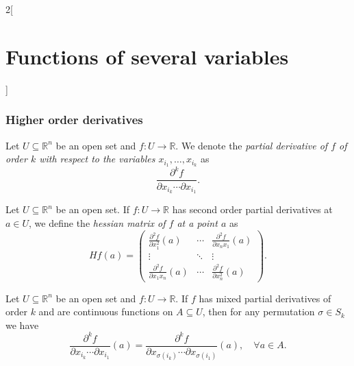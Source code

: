 \documentclass[../../../main.tex]{subfiles}
\begin{document}
\begin{multicols}{2}[\section{Functions of several variables}]
\subsubsection*{Higher order derivatives}
\begin{definition}
Let $U\subseteq\mathbb{R}^n$ be an open set and $f:U\rightarrow\mathbb{R}$. We denote the \textit{partial derivative of $f$ of order $k$ with respect to the variables $x_{i_1},\ldots,x_{i_k}$} as $$\frac{\partial^kf}{\partial x_{i_k}\cdots\partial x_{i_1}}.$$
\end{definition}
\begin{definition}
Let $U\subseteq\mathbb{R}^n$ be an open set. If $f:U\rightarrow\mathbb{R}$ has second order partial derivatives at $a\in U$, we define the \textit{hessian matrix of $f$ at a point $a$} as $$Hf(a)=\begin{pmatrix}
\displaystyle \frac{\partial^2 f}{\partial x_1^2}(a) &\cdots & \displaystyle \frac{\partial^2 f}{\partial x_nx_1}(a)\\
\vdots & \ddots & \vdots \\
\displaystyle \frac{\partial^2 f}{\partial x_1x_n}(a) & \cdots & \displaystyle \frac{\partial^2 f}{\partial x_n^2}(a)
\end{pmatrix}.$$
\end{definition}
\begin{theorem}
Let $U\subseteq\mathbb{R}^n$ be an open set and $f:U\rightarrow\mathbb{R}$. If $f$ has mixed partial derivatives of order $k$ and are continuous functions on $A\subseteq U$, then for any permutation $\sigma\in S_k$ we have $$\frac{\partial^kf}{\partial x_{i_k}\cdots\partial x_{i_1}}(a)=\frac{\partial^kf}{\partial x_{\sigma(i_k)}\cdots\partial x_{\sigma(i_1)}}(a),\quad\forall a\in A.$$
\end{theorem}

\end{multicols}
\end{document}
